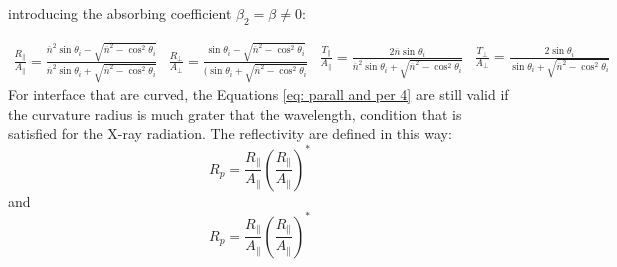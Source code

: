 \begin{flushleft}
introducing the absorbing coefficient $\beta_2 = \beta \neq 0 $:
\end{flushleft}
\begin{subequations}
\begin{equation}
\begin{aligned}
\frac{R_{\parallel}}{A_{\parallel}} = \frac{\overline{n}^2 \sin \theta_i - \sqrt{\overline{n}^2 - \cos^2 \theta_i}}{\overline{n}^2 \sin \theta_i + \sqrt{\overline{n}^2 - \cos^2 \theta_i}} 
\end{aligned}
\label{eq: R/A parll 3}
\end{equation}
\begin{equation}
\begin{aligned}
\frac{R_{\perp}}{A_{\perp}} = \frac{\sin \theta_i - \sqrt{\overline{n}^2 - \cos^2 \theta_i}}{(\sin \theta_i  +  \sqrt{\overline{n}^2 - \cos^2 \theta_i}} 
\end{aligned}
\label{eq: R/A perp 3}
\end{equation}
\begin{equation}
\begin{aligned}
\frac{T_{\parallel}}{A_{\parallel}} = \frac{2\overline{n} \sin \theta_i }{\overline{n}^2 \sin \theta_i  +  \sqrt{\overline{n}^2 - \cos^2 \theta_i}} 
\end{aligned}
\label{eq: T/A parll 3}
\end{equation}
\begin{equation}
\begin{aligned}
\frac{T_{\perp}}{A_{\perp}} = \frac{2 \sin \theta_i }{ \sin \theta_i  +  \sqrt{\overline{n}^2 - \cos^2 \theta_i}} 
\end{aligned}
\label{eq: T/A perp 3}
\end{equation}
\label{eq: parall and per 4}
\end{subequations}
For interface that are curved, the Equations \ref{eq: parall and per 4} are still valid if the curvature radius is much grater that the wavelength, condition that is satisfied for the X-ray radiation.
The reflectivity are defined in this way:
\begin{equation}
R_p =\frac{R_{\parallel}}{A_{\parallel}} \left(\frac{R_{\parallel}}{A_{\parallel}} \right)^{*}
\label{eq: Rp}
\end{equation}
\noindent and
\begin{equation}
R_p =\frac{R_{\parallel}}{A_{\parallel}} \left(\frac{R_{\parallel}}{A_{\parallel}} \right)^{*}
\label{eq: Rs}
\end{equation}

